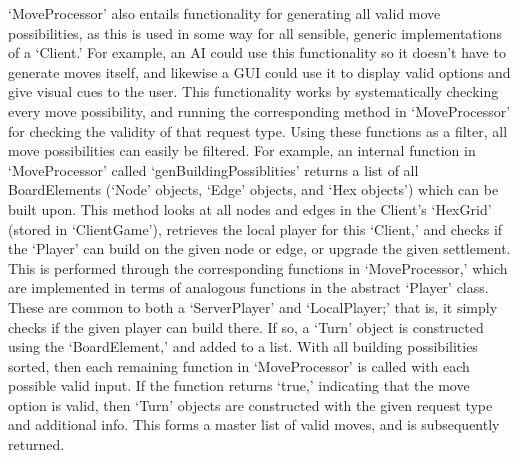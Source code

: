\documentclass[a4paper,doc,draftfirst]{apa6}
\begin{document}
‘MoveProcessor’ also entails functionality for generating all valid move possibilities, as this is used in some way for all sensible, generic implementations of a ‘Client.’ For example, an AI could use this functionality so it doesn’t have to generate moves itself, and likewise a GUI could use it to display valid options and give visual cues to the user. This functionality works by systematically checking every move possibility, and running the corresponding method in ‘MoveProcessor’ for checking the  validity of that request type. Using these functions as a filter, all move possibilities can easily be filtered. For example, an internal function in ‘MoveProcessor’ called ‘genBuildingPossiblities’ returns a list of all BoardElements (‘Node’ objects, ‘Edge’ objects, and ‘Hex objects’) which can be built upon. This method looks at all nodes and edges in the Client’s ‘HexGrid’ (stored in ‘ClientGame’), retrieves the local player for this ‘Client,’ and checks if the ‘Player’ can build on the given node or edge, or upgrade the given settlement. This is performed through the corresponding functions in ‘MoveProcessor,’ which are implemented in terms of analogous functions in the abstract ‘Player’ class. These are common to both a ‘ServerPlayer’ and ‘LocalPlayer;’ that is, it simply checks if the given player can build there. If so, a ‘Turn’ object is constructed using the ‘BoardElement,’ and added to a list. With all building possibilities sorted, then each remaining function in ‘MoveProcessor’ is called with each possible valid input. If the function returns ‘true,’ indicating that the move option is valid, then ‘Turn’ objects are constructed with the given request type and additional info. This forms a master list of valid moves, and is subsequently returned.
\end{document}
